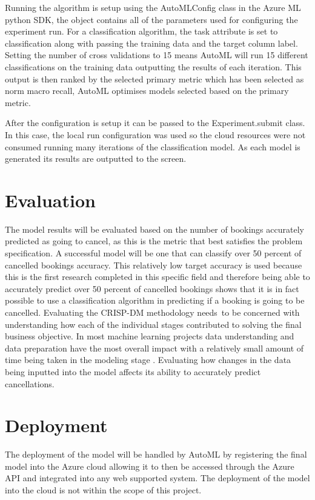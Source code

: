 Running the algorithm is setup using the AutoMLConfig class in the Azure ML python SDK, the object contains all of the parameters used for configuring the experiment run. For a classification algorithm, the task attribute is set to classification along with passing the training data and the target column label. Setting the number of cross validations to 15 means AutoML will run 15 different classifications on the training data outputting the results of each iteration. This output is then ranked by the selected primary metric which has been selected as norm macro recall, AutoML optimises models selected based on the primary metric. 

\vspace{5mm}

After the configuration is setup it can be passed to the Experiment.submit class. In this case, the local run configuration was used so the cloud resources were not consumed running many iterations of the classification model. As each model is generated its results are outputted to the screen.

\section{Evaluation}

The model results will be evaluated based on the number of bookings accurately predicted as going to cancel, as this is the metric that best satisfies the problem specification. A successful model will be one that can classify over 50 percent of cancelled bookings accuracy. This relatively low target accuracy is used because this is the first research completed in this specific field and therefore being able to accurately predict over 50 percent of cancelled bookings shows that it is in fact possible to use a classification algorithm in predicting if a booking is going to be cancelled. Evaluating the CRISP-DM methodology needs to be concerned with understanding how each of the individual stages contributed to solving the final business objective. In most machine learning projects data understanding and data preparation have the most overall impact with a relatively small amount of time being taken in the modeling stage \cite{Polyzotis2018DataSurvey}. Evaluating how changes in the data being inputted into the model affects its ability to accurately predict cancellations.

\section{Deployment}

The deployment of the model will be handled by AutoML by registering the final model into the Azure cloud allowing it to then be accessed through the Azure API and integrated into any web supported system. The deployment of the model into the cloud is not within the scope of this project.



